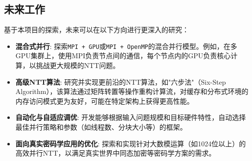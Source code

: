 \documentclass[a4paper]{article}
\begin{document}
\subsection{未来工作}
基于本项目的探索，未来可以在以下方向进行更深入的研究：
\begin{itemize}
    \item \textbf{混合式并行}: 探索\texttt{MPI + GPU}或\texttt{MPI + OpenMP}的混合并行模型。例如，在多GPU集群上，使用MPI负责节点间的通信，每个节点内的GPU负责核心计算，以挑战更大规模的NTT问题。
    \item \textbf{高级NTT算法}: 研究并实现更前沿的NTT算法，如"六步法"（Six-Step Algorithm），该算法通过矩阵转置等操作重构计算流，对缓存和分布式环境的内存访问模式更为友好，可能在特定架构上获得更高性能。
    \item \textbf{自动化与自适应调优}: 开发能够根据输入问题规模和目标硬件特性，自动选择最佳并行策略和参数（如线程数、分块大小等）的框架。
    \item \textbf{面向真实密码学应用的优化}: 探索和实现针对大数模运算（如1024位以上）的高效并行NTT，以满足真实世界中同态加密等密码学方案的需求。
\end{itemize}

\newpage
{}
{}
\nocite{*}


\end{document}
